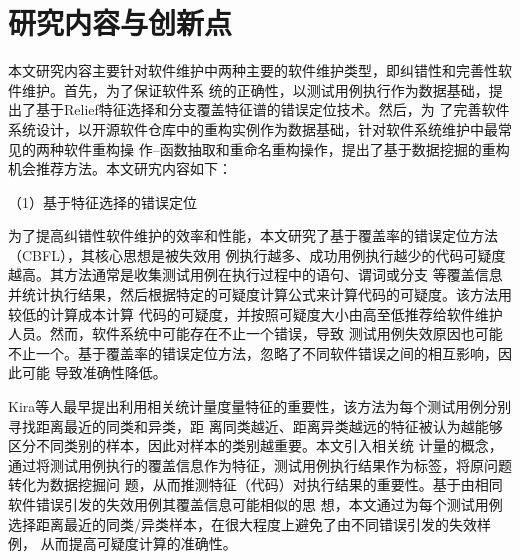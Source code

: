 \iffalse
纠错性软件维护是保证软件正确性的重要手段，是完善性软件维护的基础；同时，完善性软件维护通过改进软件设
计、提高软件质量的方式，让代码更易读，提高故障定位和错误修复的效率。

适应性维护通常是为了让软件适应技术和外部环境的变化而进行的。一方面，随着软件开发技术的发展和操作系统
版本的更迭，软件维护人员需要不断改进软件从而适应新的技术环境；另一方面，硬件环境的更新带来系统性能和
效率的大幅度提升，这就要求软件维护人员有计划性地修改软件系统，从而适应新的硬件环境。


预防性软件维护是为了适应未来软件的环境变化，将被动转化为主动而添加的新功能。对软件系统的维护工作并不
一定只能在软件系统出了错误或是用户提出需求才能执行，合理的预防性的软件维护可以将软件维护的成本降低，
提高用户的使用体验。对正在使用中的软件系统，预防性软件维护考虑到将来可能发生的修改，对软件系统实施有
计划性的修改，从而使其容易适应环境和需求的改变，不易被淘汰。

\fi
\section{研究内容与创新点}
本文研究内容主要针对软件维护中两种主要的软件维护类型，即纠错性和完善性软件维护。首先，为了保证软件系
统的正确性，以测试用例执行作为数据基础，提出了基于Relief特征选择和分支覆盖特征谱的错误定位技术。然后，为
了完善软件系统设计，以开源软件仓库中的重构实例作为数据基础，针对软件系统维护中最常见的两种软件重构操
作--函数抽取和重命名重构操作，提出了基于数据挖掘的重构机会推荐方法。本文研宄内容如下：

（1）基于特征选择的错误定位

为了提高纠错性软件维护的效率和性能，本文研究了基于覆盖率的错误定位方法（CBFL），其核心思想是被失效用
例执行越多、成功用例执行越少的代码可疑度越高。其方法通常是收集测试用例在执行过程中的语句、谓词或分支
等覆盖信息并统计执行结果，然后根据特定的可疑度计算公式来计算代码的可疑度。该方法用较低的计算成本计算
代码的可疑度，并按照可疑度大小由高至低推荐给软件维护人员。然而，软件系统中可能存在不止一个错误，导致
测试用例失效原因也可能不止一个。基于覆盖率的错误定位方法，忽略了不同软件错误之间的相互影响，因此可能
导致准确性降低。

Kira等人最早提出利用相关统计量度量特征的重要性，该方法为每个测试用例分别寻找距离最近的同类和异类，距
离同类越近、距离异类越远的特征被认为越能够区分不同类别的样本，因此对样本的类别越重要。本文引入相关统
计量的概念，通过将测试用例执行的覆盖信息作为特征，测试用例执行结果作为标签，将原问题转化为数据挖掘问
题，从而推测特征（代码）对执行结果的重要性。基于由相同软件错误引发的失效用例其覆盖信息可能相似的思
想，本文通过为每个测试用例选择距离最近的同类/异类样本，在很大程度上避免了由不同错误引发的失效样例，
从而提高可疑度计算的准确性。

